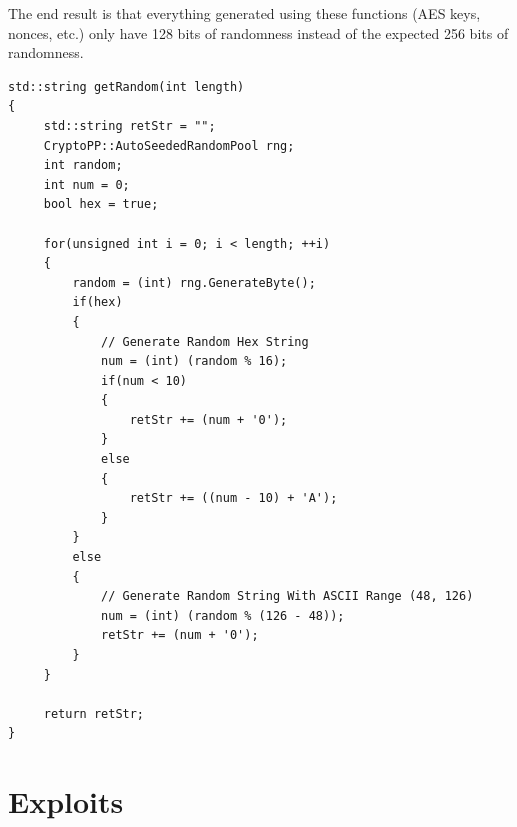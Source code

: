 \documentclass{article}
\begin{document}
The end result is that everything generated using these functions (AES keys, nonces, etc.) only
have 128 bits of randomness instead of the expected 256 bits of randomness.
\begin{lstlisting}
std::string getRandom(int length)
{
     std::string retStr = "";
     CryptoPP::AutoSeededRandomPool rng;
     int random;
     int num = 0;
     bool hex = true;

     for(unsigned int i = 0; i < length; ++i)
     {
         random = (int) rng.GenerateByte();
         if(hex)
         {
             // Generate Random Hex String
             num = (int) (random % 16);
             if(num < 10)
             {
                 retStr += (num + '0');
             }
             else
             {
                 retStr += ((num - 10) + 'A');
             }
         }
         else
         {
             // Generate Random String With ASCII Range (48, 126)
             num = (int) (random % (126 - 48));
             retStr += (num + '0');
         }
     }

     return retStr;
}
\end{lstlisting}

\section{Exploits}
\end{document}
